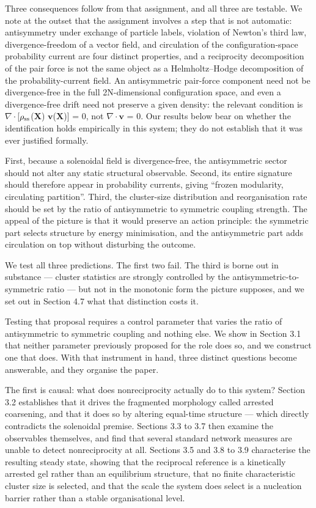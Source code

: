 \documentclass[aps,pre,preprint,superscriptaddress,nofootinbib,longbibliography]{revtex4-2}
\begin{document}
Three consequences follow from that assignment, and all three are testable. We note at the outset that the assignment involves a step that is not automatic: antisymmetry under exchange of particle labels, violation of Newton's third law, divergence-freedom of a vector field, and circulation of the configuration-space probability current are four distinct properties, and a reciprocity decomposition of the pair force is not the same object as a Helmholtz--Hodge decomposition of the probability-current field. An antisymmetric pair-force component need not be divergence-free in the full 2N-dimensional configuration space, and even a divergence-free drift need not preserve a given density: the relevant condition is $\nabla \cdot$[$\rho_{\rm ss}$($\mathbf{X}$) $\mathbf{v}$($\mathbf{X}$)] = 0, not $\nabla \cdot$$\mathbf{v}$ = 0. Our results below bear on whether the identification holds empirically in this system; they do not establish that it was ever justified formally.

First, because a solenoidal field is divergence-free, the antisymmetric sector should not alter any static structural observable. Second, its entire signature should therefore appear in probability currents, giving ``frozen modularity, circulating partition''. Third, the cluster-size distribution and reorganisation rate should be set by the ratio of antisymmetric to symmetric coupling strength. The appeal of the picture is that it would preserve an action principle: the symmetric part selects structure by energy minimisation, and the antisymmetric part adds circulation on top without disturbing the outcome.

We test all three predictions. The first two fail. The third is borne out in substance --- cluster statistics are strongly controlled by the antisymmetric-to-symmetric ratio --- but not in the monotonic form the picture supposes, and we set out in Section 4.7 what that distinction costs it.

Testing that proposal requires a control parameter that varies the ratio of antisymmetric to symmetric coupling and nothing else. We show in Section 3.1 that neither parameter previously proposed for the role does so, and we construct one that does. With that instrument in hand, three distinct questions become answerable, and they organise the paper.

The first is causal: what does nonreciprocity actually do to this system? Section 3.2 establishes that it drives the fragmented morphology called arrested coarsening, and that it does so by altering equal-time structure --- which directly contradicts the solenoidal premise. Sections 3.3 to 3.7 then examine the observables themselves, and find that several standard network measures are unable to detect nonreciprocity at all. Sections 3.5 and 3.8 to 3.9 characterise the resulting steady state, showing that the reciprocal reference is a kinetically arrested gel rather than an equilibrium structure, that no finite characteristic cluster size is selected, and that the scale the system does select is a nucleation barrier rather than a stable organisational level.
\end{document}
